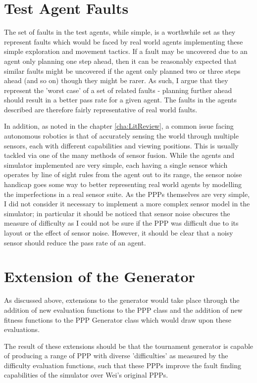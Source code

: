 \documentclass[authoryearcitations]{UoYCSproject}
\begin{document}
\section{Test Agent Faults}
\label{sec:da_6}
The set of faults in the test agents, while simple, is a worthwhile set as they represent faults which would be faced by real world agents implementing these simple exploration and movement tactics. If a fault may be uncovered due to an agent only planning one step ahead, then it can be reasonably expected that similar faults might be uncovered if the agent only planned two or three steps ahead (and so on) though they might be rarer. As such, I argue that they represent the 'worst case' of a set of related faults - planning further ahead should result in a better pass rate for a given agent. The faults in the agents described are therefore fairly representative of real world faults.

In addition, as noted in the chapter \ref{cha:LitReview}, a common issue facing autonomous robotics is that of accurately sensing the world through multiple sensors, each with different capabilities and viewing positions. This is usually tackled via one of the many methods of sensor fusion. While the agents and simulator implemented are very simple, each having a single sensor which operates by line of sight rules from the agent out to its range, the sensor noise handicap goes some way to better representing real world agents by modelling the imperfections in a real sensor suite. As the PPPs themselves are very simple, I did not consider it necessary to implement a more complex sensor model in the simulator; in particular it should be noticed that sensor noise obscures the measure of difficulty as I could not be sure if the PPP was difficult due to its layout or the effect of sensor noise. However, it should be clear that a noisy sensor should reduce the pass rate of an agent.

\section{Extension of the Generator}
\label{sec:da_7}
As discussed above, extensions to the generator would take place through the addition of new evaluation functions to the PPP class and the addition of new fitness functions to the PPP Generator class which would draw upon these evaluations. 

The result of these extensions should be that the tournament generator is capable of producing a range of PPP with diverse 'difficulties' as measured by the difficulty evaluation functions, such that these PPPs improve the fault finding capabilities of the simulator over Wei's original PPPs.
\end{document}
